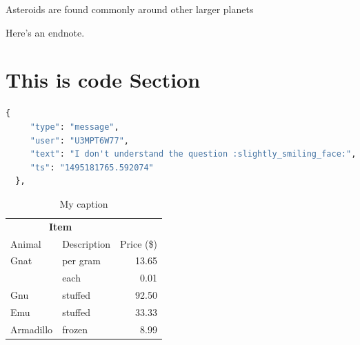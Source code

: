 \lipsum[3] Asteroids are found commonly around other larger planets

\lipsum[4-5] 

Here's an endnote.

\section{This is code Section}

\begin{lstlisting}[language=Python, caption=JSON example]
 {
     "type": "message",
     "user": "U3MPT6W77",
     "text": "I don't understand the question :slightly_smiling_face:",
     "ts": "1495181765.592074"
  },
\end{lstlisting}


\begin{table}[]
\centering
\caption{My caption}
\label{my-label}
\begin{tabular}{llr}
\hline
\multicolumn{2}{c}{\textbf{Item}} &            \\ \cline{1-2}
Animal         & Description      & Price (\$) \\ \hline
Gnat           & per gram         & 13.65      \\
               & each             & 0.01       \\
Gnu            & stuffed          & 92.50      \\
Emu            & stuffed          & 33.33      \\
Armadillo      & frozen           & 8.99       \\ \hline
\end{tabular}
\end{table}
